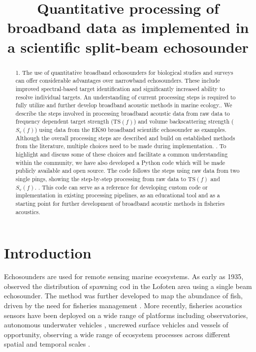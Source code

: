 \documentclass[preprint,12pt,TurnOnLineNumbers]{JASAnew}
\newcommand{\freqsym}{f}
\newcommand{\ts}{\textrm{TS}}
\newcommand{\sv}{S_{\textrm{v}}}
\begin{document}
\title[]{Quantitative processing of broadband data as implemented in a scientific split-beam echosounder}

\begin{abstract}
1. The use of quantitative broadband echosounders for biological studies and surveys can offer considerable advantages over narrowband echosounders. These include improved spectral-based target identification and significantly increased ability to resolve individual targets. An understanding of current processing steps is required to fully utilize and further develop broadband acoustic methods in marine ecology.. We describe the steps involved in processing broadband acoustic data from raw data to frequency dependent target strength ($\ts(\freqsym)$) and volume backscattering strength ($\sv(\freqsym)$) using data from the EK80 broadband scientific echosounder as examples. Although the overall processing steps are described and build on established methods from the literature, multiple choices need to be made during implementation. . To highlight and discuss some of these choices and facilitate a common understanding within the community, we have also developed a Python code which will be made publicly available and open source. The code follows the steps using raw data from two single pings, showing the step-by-step processing from raw data to $\ts(\freqsym)$ and $\sv(\freqsym)$. . This code can serve as a reference for developing custom code or implementation in existing processing pipelines, as an educational tool and as a starting point for further development of broadband acoustic methods in fisheries acoustics.\linebreak

\end{abstract}

\maketitle


\section{Introduction}

Echosounders are used for remote sensing marine ecosystems. As early as 1935, \citet{sund_echo_1935} observed the distribution of spawning cod in the Lofoten area using a single beam echosounder. The method was further developed to map the abundance of fish, driven by the need for fisheries management \citep{Simmonds2005Fisheries}. More recently, fisheries acoustics sensors have been deployed on a wide range of platforms including observatories, autonomous underwater vehicles \citep{fernandes_autonomous_2003}, uncrewed surface vehicles \citep{de_robertis_uncrewed_2021} and vessels of opportunity, observing a wide range of ecosystem processes across different spatial and temporal scales \citep{godo_marine_2014}.
\end{document}
